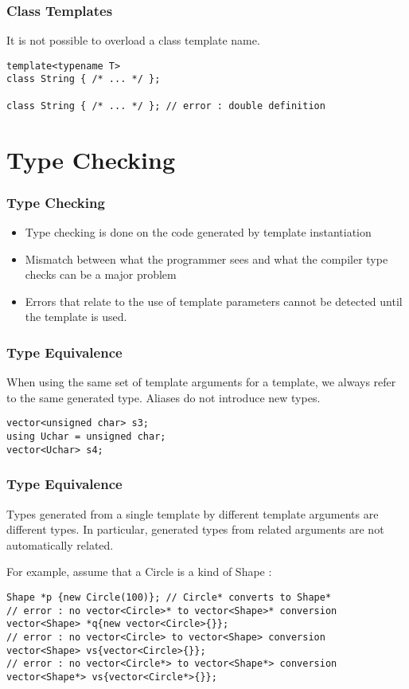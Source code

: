 \documentclass{beamer}
\begin{document}
\begin{frame}[fragile]
\frametitle{Class Templates}
It is not possible to overload a class template name.
\begin{lstlisting}
template<typename T>
class String { /* ... */ };

class String { /* ... */ }; // error : double definition

\end{lstlisting}


\end{frame}


\section{Type Checking}
\begin{frame}
\frametitle{Type Checking}

\begin{itemize}
\item Type checking is done on the code generated by template instantiation

\item Mismatch between what the programmer sees and what the compiler type checks can be a major problem

\item Errors that relate to the use of template parameters cannot be detected until the template is used.

\end{itemize}

\end{frame}

\begin{frame}[fragile]
\frametitle{Type Equivalence}

When using the same set of template arguments for a template, 
we always refer to the same generated type.
Aliases do not introduce new types.

\begin{lstlisting}
vector<unsigned char> s3;
using Uchar = unsigned char;
vector<Uchar> s4;
\end{lstlisting}

\end{frame}

\begin{frame}[fragile]
\frametitle{Type Equivalence}
Types generated from a single template by different template arguments 
are different types. 
In particular, generated types from related arguments are not automatically related.

For example, assume that a Circle is a kind of Shape :
\begin{lstlisting}
Shape *p {new Circle(100)}; // Circle* converts to Shape*
// error : no vector<Circle>* to vector<Shape>* conversion
vector<Shape> *q{new vector<Circle>{}};
// error : no vector<Circle> to vector<Shape> conversion 
vector<Shape> vs{vector<Circle>{}};
// error : no vector<Circle*> to vector<Shape*> conversion
vector<Shape*> vs{vector<Circle*>{}};

\end{lstlisting}
\end{frame}
\end{document}
